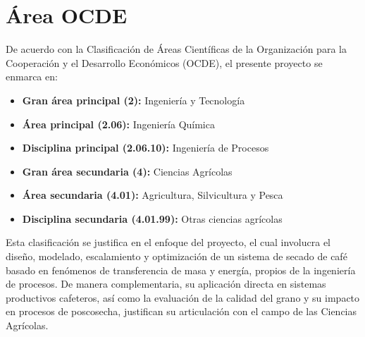 \section{Área OCDE}

De acuerdo con la Clasificación de Áreas Científicas de la Organización para la Cooperación y el Desarrollo Económicos (OCDE), el presente proyecto se enmarca en:

\begin{itemize}
    \item \textbf{Gran área principal (2):} Ingeniería y Tecnología
    \item \textbf{Área principal (2.06):} Ingeniería Química
    \item \textbf{Disciplina principal (2.06.10):} Ingeniería de Procesos

    \item \textbf{Gran área secundaria (4):} Ciencias Agrícolas
    \item \textbf{Área secundaria (4.01):} Agricultura, Silvicultura y Pesca
    \item \textbf{Disciplina secundaria (4.01.99):} Otras ciencias agrícolas
\end{itemize}

Esta clasificación se justifica en el enfoque del proyecto, el cual involucra el diseño, modelado, escalamiento y optimización de un sistema de secado de café basado en fenómenos de transferencia de masa y energía, propios de la ingeniería de procesos. De manera complementaria, su aplicación directa en sistemas productivos cafeteros, así como la evaluación de la calidad del grano y su impacto en procesos de poscosecha, justifican su articulación con el campo de las Ciencias Agrícolas.